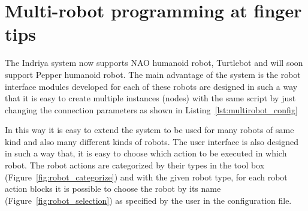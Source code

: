 \section{Multi-robot programming at finger tips}
The Indriya system now supports NAO humanoid robot, Turtlebot and will soon support Pepper humanoid robot. The main advantage of the system is the robot interface modules developed for each of these robots are designed in such a way that it is easy to create multiple instances (nodes) with the same script by just changing the connection parameters as shown in Listing~\ref{lst:multirobot_config}

In this way it is easy to extend the system to be used for many robots of same kind and also many different kinds of robots. The user interface is also designed in such a way that, it is easy to choose which action to be executed in which robot. The robot actions are categorized by their types in the tool box (Figure~\ref{fig:robot_categorize}) and with the given robot type, for each robot action blocks it is possible to choose the robot by its name (Figure~\ref{fig:robot_selection}) as specified by the user in the configuration file.
